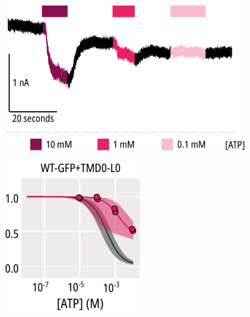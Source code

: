 \begin{figure}[hbtp]
\begin{subfigure}[t]{0.45\textwidth}
	\end{subfigure}
	\vfill
	\begin{subfigure}[t]{0.55\textwidth}
		\caption{}\label{ch6fig:tmd0_atp_trace}
		\centering
		\includegraphics[width=\textwidth]{tmd0_atp_trace.pdf}
	\end{subfigure}
	\hfill
	\begin{subfigure}[t]{0.35\textwidth}
		\caption{}\label{ch6fig:tmd0_atp_1}
		\centering
		\includegraphics[width=\textwidth]{tmd0_atp_1.pdf}

\end{subfigure}
\end{figure}

